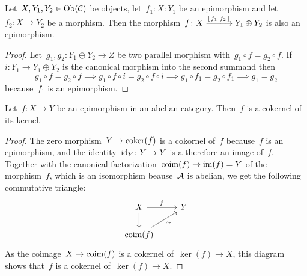 \section{}

\begin{lemma}
  \label{epi in component}
  Let~$X, Y_1, Y_2 \in \operatorname{Ob}(\mathcal{C})$ be objects, let~$f_1 \colon X \colon Y_1$ be an epimorphism and let~$f_2 \colon X \to Y_2$ be a morphism.
  Then the morphism~$f \colon X \xrightarrow{\begin{bsmallmatrix} f_1 & f_2 \end{bsmallmatrix}} Y_1 \oplus Y_2$ is also an epimorphism.
\end{lemma}

\begin{proof}
  Let~$g_1, g_2 \colon Y_1 \oplus Y_2 \to Z$ be two parallel morphism with~$g_1 \circ f = g_2 \circ f$.
  If~$i \colon Y_1 \to Y_1 \oplus Y_2$ is the canonical morphism into the second summand then
  \[
              g_1 \circ f = g_2 \circ f
    \implies  g_1 \circ f \circ i = g_2 \circ f \circ i
    \implies  g_1 \circ f_1 = g_2 \circ f_1
    \implies  g_1 = g_2
  \]
  because~$f_1$ is an epimorphism.
\end{proof}

\begin{lemma}
  \label{epi is cokernel of kernel}
  Let~$f \colon X \to Y$ be an epimorphism in an abelian category.
  Then~$f$ is a cokernel of its kernel.
\end{lemma}

\begin{proof}
  The zero morphism~$Y \to \operatorname{coker}(f)$ is a cokornel of~$f$ because~$f$ is an epimorphism, and the identity~$\operatorname{id}_Y \colon Y \to Y$ is a therefore an image of~$f$.
  Together with the canonical factorization~$\operatorname{coim}(f) \to \operatorname{im}(f) = Y$ of the morphism~$f$, which is an isomorphism beause~$\mathcal{A}$ is abelian, we get the following commutative triangle:
  \[
    \begin{tikzcd}
        X
        \arrow{r}[above]{f}
        \arrow{d}
      & Y
      \\
        \coim(f)
        \arrow{ur}[below right]{\sim}
      & {}
    \end{tikzcd}
  \]
  As the coimage~$X \to \operatorname{coim}(f)$ is a cokernel of~$\ker(f) \to X$, this diagram shows that~$f$ is a cokernel of~$\ker(f) \to X$.
\end{proof}

